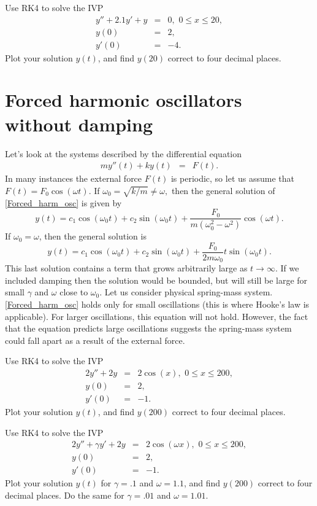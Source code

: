 \begin{problem}
Use RK4 to solve the IVP
\begin{eqnarray*}
y'' +2.1 y'+ y &=& 0,\,\, 0 \leq x \leq 20,\\
y(0) &=& 2, \\
y'(0) &=& -4.
\end{eqnarray*} 
Plot your solution $y(t)$, and find $y(20)$ correct to four decimal places. 
\end{problem}


\section*{Forced harmonic oscillators without damping}
Let's look at the systems described by the differential equation
\begin{eqnarray}
my''(t)  + ky(t) &=& F(t). \label{Forced_harm_osc}
\end{eqnarray}
In many instances the external force $F(t)$ is periodic, so let us assume that $F(t) = F_0 \cos(\omega t)$. If $\omega_0 = \sqrt{k/m} \not = \omega,$ then the  general solution of \ref{Forced_harm_osc} is given by 
\[y(t) = c_1 \cos (\omega_0 t) + c_2\sin (\omega_0 t) + \frac{F_0}{m(\omega_0^2 - \omega^2)} \cos (\omega t).\]
If $\omega_0 = \omega$, then the general solution is 
\[y(t) = c_1 \cos (\omega_0 t) + c_2\sin (\omega_0 t) + \frac{F_0}{2m\omega_0} t \sin (\omega_0 t).\]
This last solution contains a term that grows arbitrarily large as $t \to \infty$. If we included damping then the solution would be bounded, but will still be large for small $\gamma$ and $\omega$ close to $\omega_0$. Let us consider physical spring-mass system. \ref{Forced_harm_osc} holds only for small oscillations (this is where Hooke's law is applicable). For larger oscillations, this equation will not hold. However, the fact that the equation predicts large oscillations suggests the spring-mass system could fall apart as a result of the external force.

\begin{problem}
Use RK4 to solve the IVP
\begin{eqnarray*}
2y'' + 2y &=& 2 \cos (x), \,\, 0 \leq x \leq 200,\\
y(0) &=& 2, \\
y'(0) &=& -1.
\end{eqnarray*} 
Plot your solution $y(t)$, and find $y(200)$ correct to four decimal places. 
\end{problem}

\begin{problem}
Use RK4 to solve the IVP
\begin{eqnarray*}
2y'' + \gamma y' + 2y &=& 2 \cos (\omega x), \,\, 0 \leq x \leq 200,\\
y(0) &=& 2, \\
y'(0) &=& -1.
\end{eqnarray*} 
Plot your solution $y(t)$ for $\gamma = .1$ and $\omega =1.1$, and find $y(200)$ correct to four decimal places. 
Do the same for  $\gamma = .01$ and $\omega =1.01$.
\end{problem}

